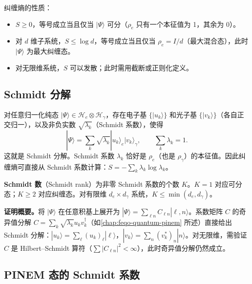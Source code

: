 纠缠熵的性质：
\begin{itemize}
\item \(S\geq0\)，等号成立当且仅当 \(|\Psi\rangle\) 可分（\(\rho_e\) 只有一个本征值为 1，其余为 0）。
\item 对 \(d\) 维子系统，\(S\leq\log d\)，等号成立当且仅当 \(\rho_e=I/d\)（最大混合态），此时 \(|\Psi\rangle\) 为最大纠缠态。
\item 对无限维系统，\(S\) 可以发散；此时需用截断或正则化定义。
\end{itemize}

\subsection{Schmidt 分解}

对任意归一化纯态 \(|\Psi\rangle\in\mathcal H_e\otimes\mathcal H_\gamma\)，存在电子基 \(\{|u_k\rangle\}\) 和光子基 \(\{|v_k\rangle\}\)（各自正交归一），以及非负实数 \(\sqrt{\lambda_k}\)（Schmidt 系数），使得
\begin{equation}
|\Psi\rangle=\sum_k\sqrt{\lambda_k}|u_k\rangle_e|v_k\rangle_\gamma,
\qquad \sum_k\lambda_k=1.
\label{eq:feqo-schmidt-decomposition}
\end{equation}
这就是 Schmidt 分解。Schmidt 系数 \(\lambda_k\) 恰好是 \(\rho_e\)（也是 \(\rho_\gamma\)）的本征值。因此纠缠熵可直接从 Schmidt 系数计算：\(S=-\sum_k\lambda_k\log\lambda_k\)。

\textbf{Schmidt 数}（Schmidt rank）为非零 Schmidt 系数的个数 \(K\)。\(K=1\) 对应可分态；\(K\geq2\) 对应纠缠态。对有限维 \(d_e\times d_\gamma\) 系统，\(K\leq\min(d_e,d_\gamma)\)。

\textbf{证明概要。}将 \(|\Psi\rangle\) 在任意积基上展开为 \(|\Psi\rangle=\sum_{\ell n}C_{\ell n}|\ell,n\rangle\)。系数矩阵 \(C\) 的奇异值分解 \(C=\sum_k\sqrt{\lambda_k}u_kv_k^\dagger\)（如\cref{chap:feqo-quantum-pinem} 所述）直接给出 Schmidt 分解：\(|u_k\rangle=\sum_\ell(u_k)_\ell|\ell\rangle\)，\(|v_k\rangle=\sum_n(v_k^*)_n|n\rangle\)。对无限维，需验证 \(C\) 是 Hilbert--Schmidt 算符（\(\sum|C_{\ell n}|^2<\infty\)），此时奇异值分解仍然成立。

\subsection{PINEM 态的 Schmidt 系数}

